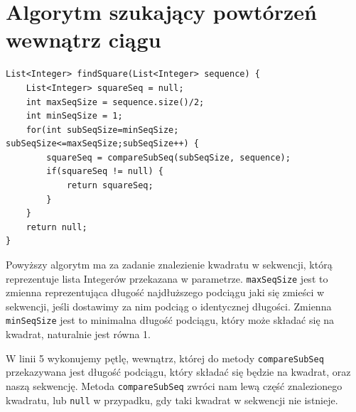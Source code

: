 \documentclass[document]{xmgr}
\begin{document}
\section{Algorytm szukający powtórzeń wewnątrz ciągu}






\begin{lstlisting}[frame=single]
List<Integer> findSquare(List<Integer> sequence) {
	List<Integer> squareSeq = null;
	int maxSeqSize = sequence.size()/2;
	int minSeqSize = 1;
	for(int subSeqSize=minSeqSize; subSeqSize<=maxSeqSize;subSeqSize++) {
		squareSeq = compareSubSeq(subSeqSize, sequence);
		if(squareSeq != null) {
			return squareSeq;
		}
	}
	return null;
}
\end{lstlisting}

Powyższy algorytm ma za zadanie znalezienie kwadratu w sekwencji, którą reprezentuje lista Integerów przekazana w parametrze. \mbox{\texttt{maxSeqSize}} jest to zmienna reprezentująca długość najdłuższego podciągu jaki się zmieści w sekwencji, jeśli dostawimy za nim podciąg o identycznej długości. Zmienna \mbox{\texttt{minSeqSize}} jest to minimalna długość podciągu, który może składać się na kwadrat, naturalnie jest równa 1. 

W linii 5 wykonujemy pętlę, wewnątrz, której do metody \texttt{compareSubSeq} przekazywana jest długość podciągu, który składać się będzie na kwadrat, oraz naszą sekwencję. Metoda \texttt{compareSubSeq} zwróci nam lewą część znalezionego kwadratu, lub \texttt{null} w przypadku, gdy taki kwadrat w sekwencji nie istnieje.
\end{document}
